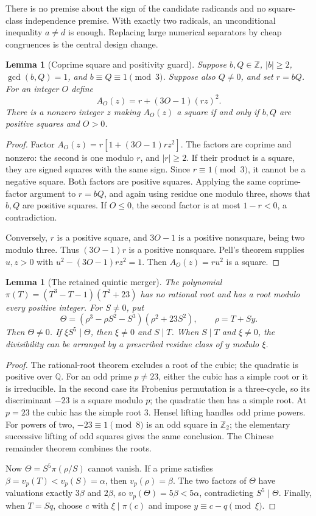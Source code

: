 \documentclass[11pt,a4paper]{article}
\newtheorem{lemma}[theorem]{Lemma}
\theoremstyle{definition}\newtheorem{definition}[theorem]{Definition}
\theoremstyle{remark}\newtheorem{remark}[theorem]{Remark}
\newcommand{\Z}{\mathbb Z}\newcommand{\N}{\mathbb N}\newcommand{\Pos}{\mathbb Z_{>0}}
\begin{document}
There is no premise about the sign of the candidate radicands and no
square-class independence premise. With exactly two radicals, an
unconditional inequality $a\ne d$ is enough. Replacing large numerical
separators by cheap congruences is the central design change.

\begin{lemma}[Coprime square and positivity guard]\label{lem:guard}
Suppose $b,Q\in\Z$, $|b|\ge2$, $\gcd(b,Q)=1$, and
$b\equiv Q\equiv1\pmod3$. Suppose also $Q\ne0$, and set $r=bQ$.
For an integer $O$ define
\[
 A_O(z)=r+(3O-1)(rz)^2.
\]
There is a nonzero integer $z$ making $A_O(z)$ a square if and only if
$b,Q$ are positive squares and $O>0$.
\end{lemma}
\begin{proof}
Factor $A_O(z)=r[1+(3O-1)rz^2]$. The factors are coprime and nonzero:
the second is one modulo $r$, and $|r|\ge2$. If their product is a square,
they are signed squares with the same sign. Since $r\equiv1\pmod3$, it
cannot be a negative square. Both factors are positive squares. Applying
the same coprime-factor argument to $r=bQ$, and again using residue one
modulo three, shows that $b,Q$ are positive squares. If $O\le0$, the
second factor is at most $1-r<0$, a contradiction.

Conversely, $r$ is a positive square, and $3O-1$ is a positive nonsquare,
being two modulo three. Thus $(3O-1)r$ is a positive nonsquare. Pell's
theorem supplies $u,z>0$ with $u^2-(3O-1)rz^2=1$. Then
$A_O(z)=ru^2$ is a square.
\end{proof}

\begin{lemma}[The retained quintic merger]\label{lem:quintic}
The polynomial $\pi(T)=(T^3-T-1)(T^2+23)$ has no rational root and has a
root modulo every positive integer. For $S\ne0$, put
\[
 \Theta=(\rho^3-\rho S^2-S^3)(\rho^2+23S^2),\qquad \rho=T+Sy.
\]
Then $\Theta\ne0$. If $\xi S^5\mid\Theta$, then $\xi\ne0$ and $S\mid T$.
When $S\mid T$ and $\xi\ne0$, the divisibility can be arranged by a
prescribed residue class of $y$ modulo $\xi$.
\end{lemma}
\begin{proof}
The rational-root theorem excludes a root of the cubic; the quadratic is
positive over $\mathbb Q$. For an odd prime $p\ne23$, either the cubic has
a simple root or it is irreducible. In the second case its Frobenius
permutation is a three-cycle, so its discriminant $-23$ is a square modulo
$p$; the quadratic then has a simple root. At $p=23$ the cubic has the
simple root 3. Hensel lifting handles odd prime powers. For powers of two,
$-23\equiv1\pmod8$ is an odd square in $\mathbb Z_2$; the elementary
successive lifting of odd squares gives the same conclusion. The Chinese
remainder theorem combines the roots.

Now $\Theta=S^5\pi(\rho/S)$ cannot vanish. If a prime satisfies
$\beta=v_p(T)<v_p(S)=\alpha$, then $v_p(\rho)=\beta$. The two factors of
$\Theta$ have valuations exactly $3\beta$ and $2\beta$, so
$v_p(\Theta)=5\beta<5\alpha$, contradicting $S^5\mid\Theta$.
Finally, when $T=Sq$, choose $c$ with $\xi\mid\pi(c)$ and impose
$y\equiv c-q\pmod\xi$.
\end{proof}
\end{document}
